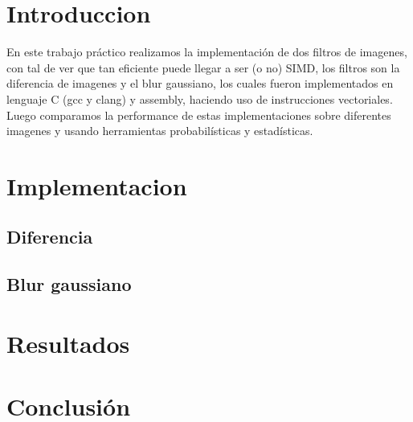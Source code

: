\documentclass[a4paper]{article}
\begin{document}
\thispagestyle{empty}


\maketitle 

\tableofcontents

\newpage

\section{Introduccion}
En este trabajo práctico realizamos la implementación de dos filtros de imagenes, con tal de ver que tan eficiente puede llegar a ser (o no) SIMD, los filtros son la diferencia de imagenes y el blur gaussiano, los cuales fueron implementados en lenguaje C (gcc y clang) y assembly, haciendo uso de instrucciones vectoriales. Luego comparamos la performance de estas implementaciones sobre diferentes imagenes y usando herramientas probabilísticas y estadísticas.

\section{Implementacion}

\subsection{Diferencia}



\subsection{Blur gaussiano}

\section{Resultados}

\section{Conclusión}
\end{document}
